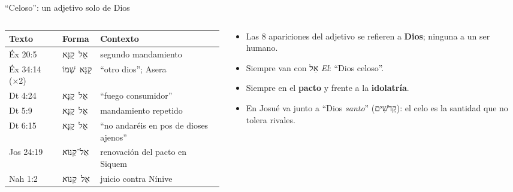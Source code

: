 \documentclass[hyperref={bookmarks=false},aspectratio=169]{beamer}
\newcommand{\heb}[1]{\mbox{\foreignlanguage{hebrew}{#1}}}
\newcommand{\destacar}[1]{\textbf{\textcolor{azul}{#1}}}
\begin{document}
\begin{frame}{``Celoso'': un adjetivo solo de Dios}
\begin{columns}[c,onlytextwidth]
\begin{column}{0.55\textwidth}
\scriptsize\renewcommand{\arraystretch}{1.12}
\begin{tabular}{@{}>{\RaggedRight\arraybackslash}p{1.6cm}>{\RaggedRight\arraybackslash}p{1.3cm}>{\RaggedRight\arraybackslash}p{3.6cm}@{}}
\toprule
\textbf{Texto} & \textbf{Forma} & \textbf{Contexto} \\ \midrule
Éx 20:5 & \heb{אֵל קַנָּא} & segundo mandamiento \\
Éx 34:14 (×2) & \heb{קַנָּא שְׁמוֹ} & ``otro dios''; Asera \\
Dt 4:24 & \heb{אֵל קַנָּא} & ``fuego consumidor'' \\
Dt 5:9 & \heb{אֵל קַנָּא} & mandamiento repetido \\
Dt 6:15 & \heb{אֵל קַנָּא} & ``no andaréis en pos de dioses ajenos'' \\
Jos 24:19 & \heb{אֵל־קַנּוֹא} & renovación del pacto en Siquem \\
Nah 1:2 & \heb{אֵל קַנּוֹא} & juicio contra Nínive \\
\bottomrule
\end{tabular}
\end{column}
\begin{column}{0.43\textwidth}\small
\begin{itemize}
\item Las 8 apariciones del adjetivo se refieren a \destacar{Dios}; ninguna a un ser humano.
\item Siempre van con \heb{אֵל} \emph{El}: ``Dios celoso''.
\item Siempre en el \destacar{pacto} y frente a la \destacar{idolatría}.
\item En Josué va junto a ``Dios \emph{santo}'' (\heb{קְדֹשִׁים}): el celo es la santidad que no tolera rivales.
\end{itemize}
\end{column}
\end{columns}
\end{frame}
\end{document}
